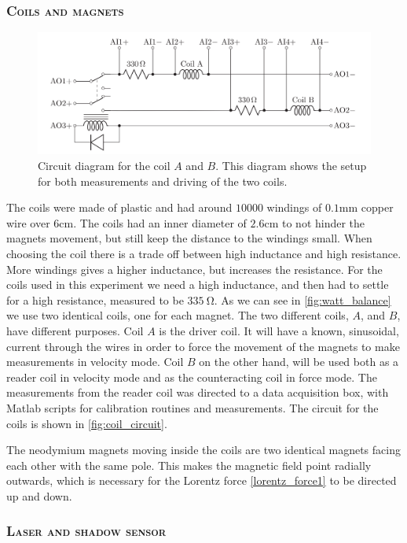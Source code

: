 \documentclass[english,a4paper,12pt,reprint]{revtex4-1}
\begin{document}
\subsubsection{\textsc{Coils and magnets}}
\begin{figure}
  \centering
  \includegraphics[scale=0.30]{coil_circuit.png}
  \caption{Circuit diagram for the coil $A$ and $B$. This diagram shows the setup for both measurements and driving of the two coils.  }
  \label{fig:coil_circuit}
\end{figure}
The coils were made of plastic and had around $10 000$ windings of $0.1$mm copper wire over $6$cm. The coils had an inner diameter of $2.6$cm to not hinder the magnets movement, but still keep the distance to the windings small. When choosing the coil there is a trade off between high inductance and high resistance. More windings gives a higher inductance, but increases the resistance. For the coils used in this experiment we need a high inductance, and then had to settle for a high resistance, measured to be $\SI{335}{\ohm}$. As we can see in \vref{fig:watt_balance} we use two identical coils, one for each magnet. The two different coils, $A$, and $B$, have different purposes. Coil $A$ is the driver coil. It will have a known, sinusoidal, current through the wires in order to force the movement of the magnets to make measurements in velocity mode. Coil $B$ on the other hand, will be used both as a reader coil in velocity mode and as the counteracting coil in force mode. The measurements from the reader coil was directed to a data acquisition box, with Matlab scripts for calibration routines and measurements. The circuit for the coils is shown in \vref{fig:coil_circuit}. \par
The neodymium magnets moving inside the coils are two identical magnets facing each other with the same pole. This makes the magnetic field point radially outwards, which is necessary for the Lorentz force \eqref{lorentz_force1} to be directed up and down.


\subsubsection{\textsc{Laser and shadow sensor}}
\end{document}
